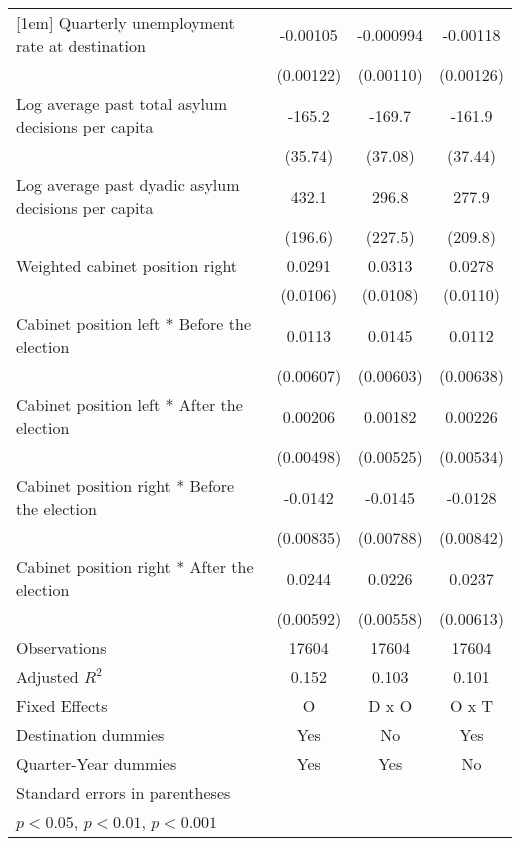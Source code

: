 \begin{table}[htbp]
\begin{tabular}{l*{3}{c}}
[1em]
Quarterly unemployment rate at destination&    -0.00105         &   -0.000994         &    -0.00118         \\
                    &   (0.00122)         &   (0.00110)         &   (0.00126)         \\
[1em]
Log average past total asylum decisions per capita&      -165.2\sym{***}&      -169.7\sym{***}&      -161.9\sym{***}\\
                    &     (35.74)         &     (37.08)         &     (37.44)         \\
[1em]
Log average past dyadic asylum decisions per capita&       432.1\sym{*}  &       296.8         &       277.9         \\
                    &     (196.6)         &     (227.5)         &     (209.8)         \\
[1em]
Weighted cabinet position right&      0.0291\sym{**} &      0.0313\sym{**} &      0.0278\sym{*}  \\
                    &    (0.0106)         &    (0.0108)         &    (0.0110)         \\
[1em]
Cabinet position left * Before the election&      0.0113         &      0.0145\sym{*}  &      0.0112         \\
                    &   (0.00607)         &   (0.00603)         &   (0.00638)         \\
[1em]
Cabinet position left * After the election&     0.00206         &     0.00182         &     0.00226         \\
                    &   (0.00498)         &   (0.00525)         &   (0.00534)         \\
[1em]
Cabinet position right * Before the election&     -0.0142         &     -0.0145         &     -0.0128         \\
                    &   (0.00835)         &   (0.00788)         &   (0.00842)         \\
[1em]
Cabinet position right * After the election&      0.0244\sym{***}&      0.0226\sym{***}&      0.0237\sym{***}\\
                    &   (0.00592)         &   (0.00558)         &   (0.00613)         \\
\hline
Observations        &       17604         &       17604         &       17604         \\
Adjusted \(R^{2}\)  &       0.152         &       0.103         &       0.101         \\
Fixed Effects       &           O         &       D x O         &       O x T         \\
Destination dummies &         Yes         &          No         &         Yes         \\
Quarter-Year dummies&         Yes         &         Yes         &          No         \\
\hline\hline
\multicolumn{4}{l}{\footnotesize Standard errors in parentheses}\\
\multicolumn{4}{l}{\footnotesize \sym{*} \(p<0.05\), \sym{**} \(p<0.01\), \sym{***} \(p<0.001\)}\\
\end{tabular}
\end{table}
